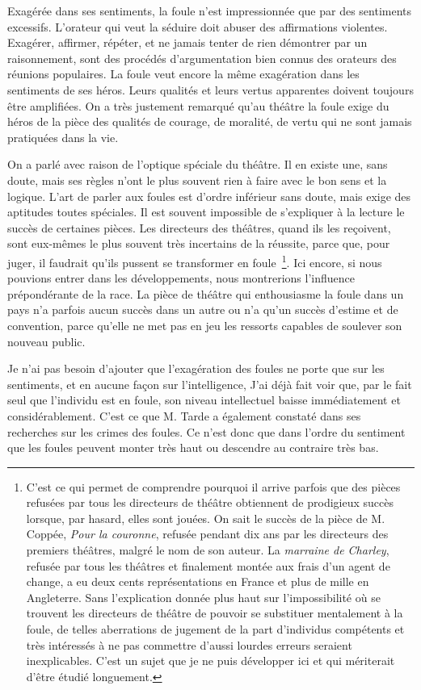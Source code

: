 \documentclass[french,twoside]{book} %
\begin{document}
Exagérée dans ses sentiments, la foule n’est impressionnée que par des sentiments excessifs. L’orateur qui veut la séduire doit abuser des affirmations violentes. Exagé­rer, affirmer, répéter, et ne jamais tenter de rien démontrer par un raisonnement, sont des procédés d’argumentation bien connus des orateurs des réunions populaires. La foule veut encore la même exagération dans les sentiments de ses héros. Leurs quali­tés et leurs vertus apparentes doivent toujours être amplifiées. On a très justement remarqué qu’au théâtre la foule exige du héros de la pièce des qualités de courage, de moralité, de vertu qui ne sont jamais pratiquées dans la vie.\par
On a parlé avec raison de l’optique spéciale du théâtre. Il en existe une, sans doute, mais ses règles n’ont le plus souvent rien à faire avec le bon sens et la logique. L’art de parler aux foules est d’ordre inférieur sans doute, mais exige des aptitudes toutes spéciales. Il est souvent impossible de s’expliquer à la lecture le succès de certaines pièces. Les directeurs des théâtres, quand ils les reçoivent, sont eux-mêmes le plus souvent très incertains de la réussite, parce que, pour juger, il faudrait qu’ils pussent se transformer en foule \footnote{C’est ce qui permet de comprendre pourquoi il arrive parfois que des pièces refusées par tous les directeurs de théâtre obtiennent de prodigieux succès lorsque, par hasard, elles sont jouées. On sait le succès de la pièce de M. Coppée, \emph{Pour la couronne}, refusée pendant dix ans par les directeurs des premiers théâtres, malgré le nom de son auteur. La \emph{marraine de Charley}, refusée par tous les théâtres et finalement montée aux frais d’un agent de change, a eu deux cents représentations en France et plus de mille en Angleterre. Sans l’explication donnée plus haut sur l’impossibilité où se trouvent les directeurs de théâtre de pouvoir se substituer mentalement à la foule, de telles aberrations de jugement de la part d’individus compétents et très intéressés à ne pas commettre d’aussi lourdes erreurs seraient inexplicables. C’est un sujet que je ne puis développer ici et qui mériterait d’être étudié longuement.}. Ici encore, si nous pouvions entrer dans les développements, nous montrerions l’influence prépondérante de la race. La pièce de théâtre qui enthousiasme la foule dans un pays n’a parfois aucun succès dans un autre ou n’a qu’un succès d’estime et de convention, parce qu’elle ne met pas en jeu les ressorts capables de soulever son nouveau public.\par
Je n’ai pas besoin d’ajouter que l’exagération des foules ne porte que sur les sentiments, et en aucune façon sur l’intelligence, J’ai déjà fait voir que, par le fait seul que l’individu est en foule, son niveau intellectuel baisse immédiatement et considéra­blement. C’est ce que M. Tarde a également constaté dans ses recherches sur les crimes des foules. Ce n’est donc que dans l’ordre du sentiment que les foules peuvent monter très haut ou descendre au contraire très bas.
\end{document}
